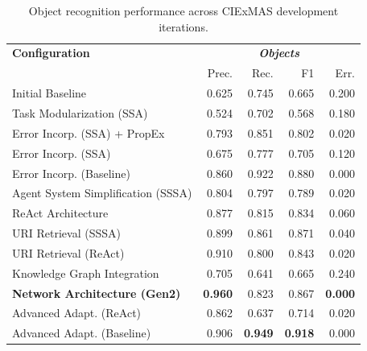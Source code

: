 \documentclass[a4paper,oneside,bibliography=totoc]{scrbook}
\begin{document}
\begin{table}[h]
  \centering
  \begin{tabular}{p{6cm}|rrrr}
    \toprule
    \textbf{Configuration}               & \multicolumn{4}{c}{\textit{\textbf{Objects}}}                                                    \\
                                         & Prec.                                         & Rec.           & F1             & Err.           \\
    \midrule
    Initial Baseline                     & 0.625                                         & 0.745          & 0.665          & 0.200          \\
    Task Modularization (SSA)            & 0.524                                         & 0.702          & 0.568          & 0.180          \\
    Error Incorp. (SSA) + PropEx         & 0.793                                         & 0.851          & 0.802          & 0.020          \\
    Error Incorp. (SSA)                  & 0.675                                         & 0.777          & 0.705          & 0.120          \\
    Error Incorp. (Baseline)             & 0.860                                         & 0.922          & 0.880          & 0.000          \\
    Agent System Simplification (SSSA)   & 0.804                                         & 0.797          & 0.789          & 0.020          \\
    ReAct Architecture                   & 0.877                                         & 0.815          & 0.834          & 0.060          \\
    \ac{URI} Retrieval (SSSA)            & 0.899                                         & 0.861          & 0.871          & 0.040          \\
    \ac{URI} Retrieval (ReAct)           & 0.910                                         & 0.800          & 0.843          & 0.020          \\
    Knowledge Graph Integration          & 0.705                                         & 0.641          & 0.665          & 0.240          \\
    \textbf{Network Architecture (Gen2)} & \textbf{0.960}                                & 0.823          & 0.867          & \textbf{0.000} \\
    Advanced Adapt. (ReAct)              & 0.862                                         & 0.637          & 0.714          & 0.020          \\
    Advanced Adapt. (Baseline)           & 0.906                                         & \textbf{0.949} & \textbf{0.918} & 0.000          \\
    \bottomrule
  \end{tabular}
  \caption{Object recognition performance across CIExMAS development iterations.}
  \label{tab:evaluation_objects_iterations}
\end{table}
\end{document}
